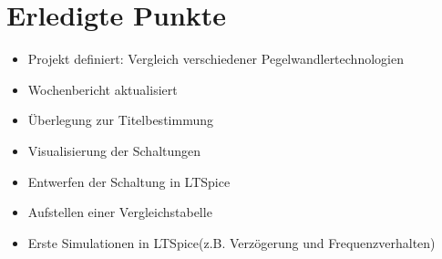 \section{Erledigte Punkte}

\begin{itemize}
  \item Projekt definiert: Vergleich verschiedener Pegelwandlertechnologien
  \item Wochenbericht aktualisiert
  \item Überlegung zur Titelbestimmung
  \item Visualisierung der Schaltungen
  \item Entwerfen der Schaltung in LTSpice
  \item Aufstellen einer Vergleichstabelle
  \item Erste Simulationen in LTSpice(z.B. Verzögerung und Frequenzverhalten)
\end{itemize}

